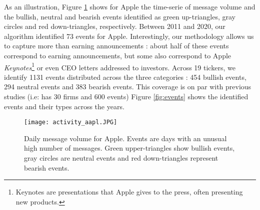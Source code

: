 As an illustration, Figure \ref{fig:activityaapl} shows for Apple the time-serie of message volume and the bullish, neutral and bearish events identified as green up-triangles, gray circles and red down-triangles, respectively. Between 2011 and 2020, our algorithm identified 73 events for Apple. Interestingly, our methodology allows us to capture more than earning announcements : about half of these events correspond to earning announcements, but some also correspond to Apple \textit{Keynotes}\footnote{Keynotes are presentations that Apple gives to the press, often presenting new products.} or even CEO letters addressed to investors. Across 19 tickers, we identify 1131 events distributed across the three categories : 454 bullish events, 294 neutral events and 383 bearish events. This coverage is on par with previous studies (i.e: \citet{mackinlay1997event} has 30 firms and 600 events) Figure \ref{fig:events} shows the identified events and their types across the years.

\begin{figure}[]
    \centering
    \texttt{[image: activity\_aapl.JPG]}
    \caption{Daily message volume for Apple. Events are days with an unusual high number of messages. Green upper-triangles show bullish events, gray circles are neutral events and red down-triangles represent bearish events.}
    \label{fig:activityaapl}
\end{figure}

